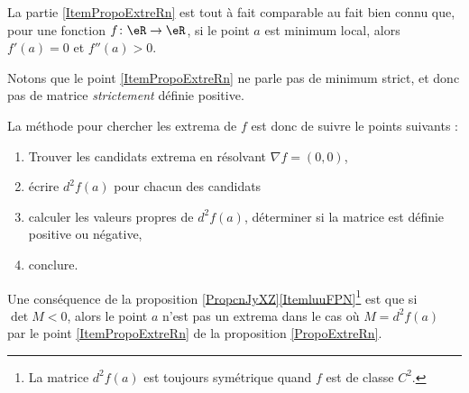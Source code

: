 La partie \ref{ItemPropoExtreRn} est tout à fait comparable au fait bien connu que, pour une fonction $f\colon \eR\to \eR$, si le point $a$ est minimum local, alors $f'(a)=0$ et $f''(a)>0$.

Notons que le point \ref{ItemPropoExtreRn} ne parle pas de minimum strict, et donc pas de matrice \emph{strictement} définie positive.

La méthode pour chercher les extrema de $f$ est donc de suivre le points suivants :
\begin{enumerate}
    \item
        Trouver les candidats extrema en résolvant $\nabla f=(0,0)$,
    \item
        écrire $d^2f(a)$ pour chacun des candidats
    \item
        calculer les valeurs propres de $d^2f(a)$, déterminer si la matrice est définie positive ou négative,
    \item
        conclure.
\end{enumerate}

Une conséquence de la proposition \ref{PropcnJyXZ}\ref{ItemluuFPN}\footnote{La matrice $d^2f(a)$ est toujours symétrique quand $f$ est de classe $C^2$.} est que si \( \det M<0\), alors le point \( a\) n'est pas  un extrema dans le cas où $M=d^2f(a)$ par le point \ref{ItemPropoExtreRn} de la proposition \ref{PropoExtreRn}.

